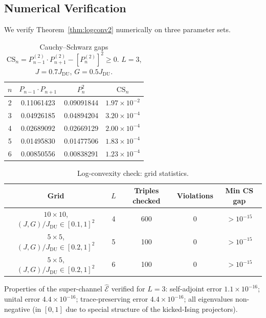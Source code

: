 \documentclass[12pt,a4paper]{article}
\begin{document}
\subsection{Numerical Verification}
\label{sec:logconv_num}

We verify Theorem~\ref{thm:logconv2} numerically on three parameter sets.

\begin{table}[h!]
\centering
\caption{Cauchy--Schwarz gaps $\mathrm{CS}_n = P_{n-1}^{(2)}\cdot P_{n+1}^{(2)} - [P_n^{(2)}]^2\geq 0$.
$L=3$, $J=0.7J_\mathrm{DU}$, $G=0.5J_\mathrm{DU}$.}
\label{tab:cs_gaps}
\begin{tabular}{c|c|c|c}
$n$ & $P_{n-1}\cdot P_{n+1}$ & $P_n^2$ & $\mathrm{CS}_n$\\
\hline
2 & 0.11061423 & 0.09091844 & $1.97\times10^{-2}$\\
3 & 0.04926185 & 0.04894204 & $3.20\times10^{-4}$\\
4 & 0.02689092 & 0.02669129 & $2.00\times10^{-4}$\\
5 & 0.01495830 & 0.01477506 & $1.83\times10^{-4}$\\
6 & 0.00850556 & 0.00838291 & $1.23\times10^{-4}$\\
\end{tabular}
\end{table}

\begin{table}[h!]
\centering
\caption{Log-convexity check: grid statistics.}
\label{tab:logconv_grid}
\begin{tabular}{c|c|c|c|c}
Grid & $L$ & Triples checked & Violations & Min CS gap\\
\hline
$10\times10$, $(J,G)/J_\mathrm{DU}\in[0.1,1]^2$ & 4 & 600 & 0 & $>10^{-15}$\\
$5\times5$, $(J,G)/J_\mathrm{DU}\in[0.2,1]^2$ & 5 & 100 & 0 & $>10^{-15}$\\
$5\times5$, $(J,G)/J_\mathrm{DU}\in[0.2,1]^2$ & 6 & 100 & 0 & $>10^{-15}$\\
\end{tabular}
\end{table}

Properties of the super-channel $\hat{\mathcal{E}}$ verified for $L=3$:
self-adjoint error $1.1\times10^{-16}$; unital error $4.4\times10^{-16}$;
trace-preserving error $4.4\times10^{-16}$; all eigenvalues non-negative
(in $[0,1]$ due to special structure of the kicked-Ising projectors).
\end{document}
